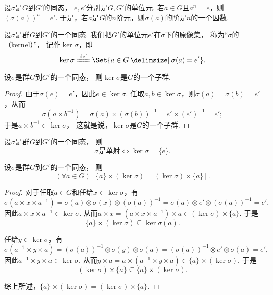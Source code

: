 \begin{property}
设\(\sigma\)是\(G\)到\(G'\)的同态，
\(e,e'\)分别是\(G,G'\)的单位元.
若\(a \in G\)且\(a^n = e\)，则\((\sigma(a))^n = e'\).
于是，若\(a\)是\(G\)的\(n\)阶元，则\(\sigma(a)\)的阶是\(n\)的一个因数.
\end{property}

\begin{definition}
设\(\sigma\)是群\(G\)到\(G'\)的一个同态.
我们把\(G'\)的单位元\(e'\)在\(\sigma\)下的原像集，
称为“\(\sigma\)的（kernel）”，
记作\(\ker\sigma\)，即\[
	\ker\sigma \defeq \Set{ a \in G \given \sigma(a) = e' }.
\]
\end{definition}

\begin{proposition}
设\(\sigma\)是群\(G\)到\(G'\)的一个同态，
则\(\ker\sigma\)是\(G\)的一个子群.
\begin{proof}
由于\(\sigma(e)=e'\)，因此\(e\in\ker\sigma\).
任取\(a,b\in\ker\sigma\)，则\(\sigma(a)=\sigma(b)=e'\)，从而\[
	\sigma(a \times b^{-1}) = \sigma(a) \times (\sigma(b))^{-1}
	= e' \times (e')^{-1}
	= e';
\]
于是\(a \times b^{-1} \in \ker\sigma\)，
这就是说，\(\ker\sigma\)是\(G\)的一个子群.
\end{proof}
\end{proposition}

\begin{proposition}
设\(\sigma\)是群\(G\)到\(G'\)的一个同态，
则\[
	\text{\(\sigma\)是单射}
	\iff
	\ker\sigma=\{e\}.
\]
\end{proposition}

\begin{proposition}
设\(\sigma\)是群\(G\)到\(G'\)的一个同态，
则\[
	(\forall a \in G)[\{a\}\times(\ker\sigma)=(\ker\sigma)\times\{a\}].
\]
\begin{proof}
对于任取\(a\in G\)和任给\(x\in\ker\sigma\)，有\[
	\sigma(a \times x \times a^{-1})
	= \sigma(a) \otimes \sigma(x) \otimes (\sigma(a))^{-1}
	= \sigma(a) \otimes e' \otimes (\sigma(a))^{-1}
	= e',
\]
因此\(a \times x \times a^{-1} \in \ker\sigma\).
从而\(a \times x
= (a \times x \times a^{-1}) \times a \in (\ker\sigma)\times\{a\}\).
于是\[
	\{a\}\times(\ker\sigma) \subseteq \ker\sigma(a).
\]

任给\(y\in\ker\sigma\)，有\[
	\sigma(a^{-1} \times y \times a)
	= (\sigma(a))^{-1} \otimes \sigma(y) \otimes \sigma(a)
	= (\sigma(a))^{-1} \otimes e' \otimes \sigma(a)
	= e',
\]
因此\(a^{-1} \times y \times a \in \ker\sigma\).
从而\(y \times a = a \times (a^{-1} \times y \times a) \in \{a\}\times(\ker\sigma)\).
于是\[
	(\ker\sigma)\times\{a\} \subseteq \{a\}\times(\ker\sigma).
\]

综上所述，\(\{a\}\times(\ker\sigma)=(\ker\sigma)\times\{a\}\).
\end{proof}
\end{proposition}

